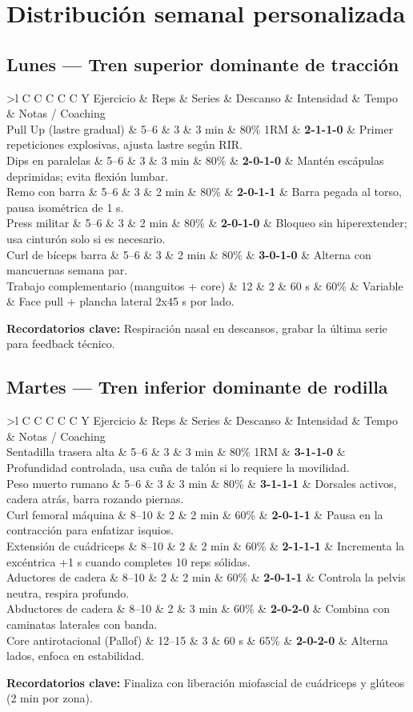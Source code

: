 \documentclass[12pt]{article}
\newcommand{\tempo}[1]{\textcolor{accent}{\textbf{#1}}}
\newcommand{\trainingday}[4]{%
  \subsection*{#1 --- #2}
  \rowcolors{2}{rowshade}{white}
  \begin{tabularx}{\linewidth}{>{\bfseries\color{primary}}l C C C C C Y}
    \toprule
    Ejercicio & Reps & Series & Descanso & Intensidad & Tempo & Notas / Coaching \\
    \midrule
    #3
    \bottomrule
  \end{tabularx}
  \vspace{0.5em}
  \textbf{Recordatorios clave:} #4
  \vspace{1em}
}
\begin{document}
\section*{Distribución semanal personalizada}
\trainingday{Lunes}{Tren superior dominante de tracción}{%
  Pull Up (lastre gradual) & 5--6 & 3 & 3 min & 80\% 1RM & \tempo{2-1-1-0} & Primer repeticiones explosivas, ajusta lastre según RIR.\\
  Dips en paralelas & 5--6 & 3 & 3 min & 80\% & \tempo{2-0-1-0} & Mantén escápulas deprimidas; evita flexión lumbar.\\
  Remo con barra & 5--6 & 3 & 2 min & 80\% & \tempo{2-0-1-1} & Barra pegada al torso, pausa isométrica de 1 s.\\
  Press militar & 5--6 & 3 & 2 min & 80\% & \tempo{2-0-1-0} & Bloqueo sin hiperextender; usa cinturón solo si es necesario.\\
  Curl de bíceps barra & 5--6 & 3 & 2 min & 80\% & \tempo{3-0-1-0} & Alterna con mancuernas semana par.\\
  Trabajo complementario (manguitos + core) & 12 & 2 & 60 s & 60\% & Variable & Face pull + plancha lateral 2x45 s por lado.\\
}{Respiración nasal en descansos, grabar la última serie para feedback técnico.}

\trainingday{Martes}{Tren inferior dominante de rodilla}{%
  Sentadilla trasera alta & 5--6 & 3 & 3 min & 80\% 1RM & \tempo{3-1-1-0} & Profundidad controlada, usa cuña de talón si lo requiere la movilidad.\\
  Peso muerto rumano & 5--6 & 3 & 3 min & 80\% & \tempo{3-1-1-1} & Dorsales activos, cadera atrás, barra rozando piernas.\\
  Curl femoral máquina & 8--10 & 2 & 2 min & 60\% & \tempo{2-0-1-1} & Pausa en la contracción para enfatizar isquios.\\
  Extensión de cuádriceps & 8--10 & 2 & 2 min & 60\% & \tempo{2-1-1-1} & Incrementa la excéntrica +1 s cuando completes 10 reps sólidas.\\
  Aductores de cadera & 8--10 & 2 & 2 min & 60\% & \tempo{2-0-1-1} & Controla la pelvis neutra, respira profundo.\\
  Abductores de cadera & 8--10 & 2 & 3 min & 60\% & \tempo{2-0-2-0} & Combina con caminatas laterales con banda.\\
  Core antirotacional (Pallof) & 12--15 & 3 & 60 s & 65\% & \tempo{2-0-2-0} & Alterna lados, enfoca en estabilidad.\\
}{Finaliza con liberación miofascial de cuádriceps y glúteos (2 min por zona).}
\end{document}
